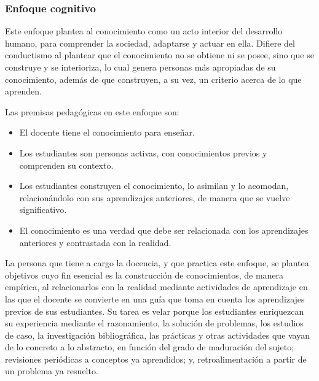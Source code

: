 \subsubsection*{Enfoque cognitivo}

Este enfoque plantea al conocimiento como un acto interior del desarrollo humano, para comprender la sociedad, adaptarse y actuar en ella.  Difiere del conductismo al plantear que el conocimiento no se obtiene ni se posee, sino que se construye y se interioriza, lo cual genera personas más apropiadas de su conocimiento, además de que construyen, a su vez, un criterio acerca de lo que aprenden. 

Las premisas pedagógicas en este enfoque son: 


\begin{itemize}
    
    \color{blue} \item \color{black} El docente tiene el conocimiento para enseñar.  

    
     \color{blue} \item \color{black} Los estudiantes son personas activas, con conocimientos previos y comprenden su contexto. 
     
    \color{blue} \item \color{black}  Los estudiantes construyen el conocimiento, lo asimilan y lo acomodan, relacionándolo con sus aprendizajes anteriores, de manera que se vuelve significativo. 
    
     \color{blue} \item \color{black} El conocimiento es una verdad que debe ser relacionada con los aprendizajes anteriores y contrastada con la realidad. 
     
     \end{itemize}
     
La persona que tiene a cargo la docencia, y que practica este enfoque, se plantea objetivos cuyo fin esencial es la construcción de conocimientos, de manera empírica, al relacionarlos con la realidad mediante actividades de aprendizaje en las que el docente se convierte en una guía que toma en cuenta los aprendizajes previos de sus estudiantes. Su tarea es velar porque los estudiantes enriquezcan su experiencia mediante el razonamiento, la solución de problemas, los estudios de caso, la investigación bibliográfica, las prácticas y otras actividades que vayan de lo concreto a lo abstracto, en función del grado de maduración del sujeto; revisiones periódicas a conceptos ya aprendidos; y, retroalimentación a partir de un problema ya resuelto. 

